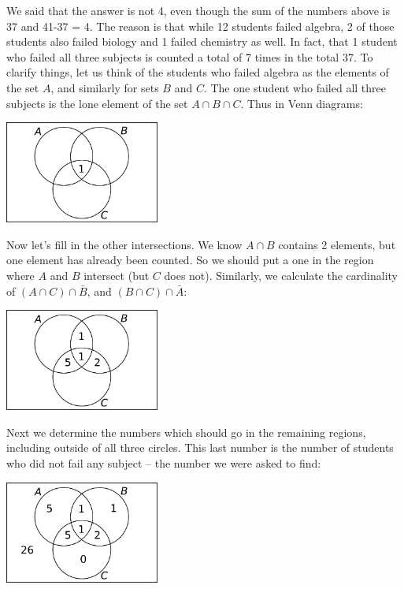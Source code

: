 We said that the answer is not 4, even though the sum of the numbers above is 37 and 41-37 = 4.  The reason is that while 12 students failed algebra, 2 of those students also failed biology and 1 failed chemistry as well.  In fact, that 1 student who failed all three subjects is counted a total of 7 times in the total 37.  To clarify things, let us think of the students who failed algebra as the elements of the set $A$, and similarly for sets $B$ and $C$.  The one student who failed all three subjects is the lone element of the set $A \cap B \cap C$.  Thus in Venn diagrams:

\begin{center}
 \includegraphics[width=2in]{pictures/venn3prob1a.png}
\end{center}

Now let's fill in the other intersections.  We know $A\cap B$ contains 2 elements, but one element has already been counted.  So we should put a one in the region where $A$ and $B$ intersect (but $C$ does not).  Similarly, we calculate the cardinality of $(A\cap C) \cap \bar B$, and $(B \cap C) \cap \bar A$:

\begin{center}
 \includegraphics[width=2in]{pictures/venn3prob1b.png}
\end{center}

Next we determine the numbers which should go in the remaining regions, including outside of all three circles.  This last number is the number of students who did not fail any subject -- the number we were asked to find:

\begin{center}
 \includegraphics[width=2in]{pictures/venn3prob1c.png}
\end{center}

